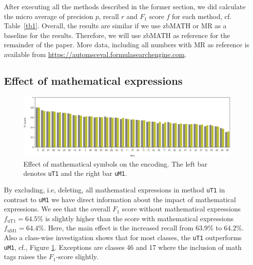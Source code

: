 After executing all the methods described in the former section, we did calculate the micro average of precision $p$, recall $r$ and $F_1$ score $f$ for each method, cf. Table~\ref{tb1}.
Overall, the results are similar if we use zbMATH or MR as a baseline for the results.
Therefore, we will use zbMATH as reference for the remainder of the paper.
More data, including all numbers with MR as reference is available from
\url{https://automsceval.formulasearchengine.com}.

\subsection{Effect of mathematical expressions}
\begin{figure}[ht]
  \centering
  \includegraphics[width=1.1\textwidth]{mathEncoding.png}
  \caption{Effect of mathematical symbols on the encoding. The left bar denotes {\texttt{uT1}} and the right bar {\texttt{uM1}}. }\label{fgMath}
\end{figure}
By excluding, i.e, deleting,
all mathematical expressions in method \texttt{uT1} in contrast to \texttt{uM1} we have direct information about the impact of mathematical expressions.
We see that the overall $F_1$ score without mathematical expressions $f_\mathrm{uT1}=64.5\%$ is slightly higher than the score with mathematical expressions $f_\mathrm{uM1}=64.4\%.$ 
Here, the main effect is the increased recall from $63.9\%$ to $64.2\%.$
Also a class-wise investigation shows that for most classes, the \texttt{uT1} outperforms \texttt{uM1}, cf., Figure \ref{fgMath}.
Exceptions are classes 46 and 17 where the inclusion of math tags raises the $F_1$-score slightly.

